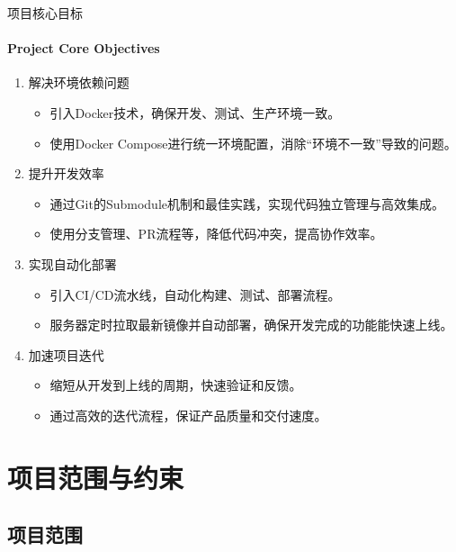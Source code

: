 \documentclass{beamer}
\begin{document}
\begin{frame}[fragile]{项目核心目标}
\framesubtitle{Project Core Objectives}
\begin{enumerate}
\item 解决环境依赖问题
\begin{itemize}
\item 引入Docker技术，确保开发、测试、生产环境一致。
\item 使用Docker Compose进行统一环境配置，消除“环境不一致”导致的问题。
\end{itemize}
\item 提升开发效率
\begin{itemize}
\item 通过Git的Submodule机制和最佳实践，实现代码独立管理与高效集成。
\item 使用分支管理、PR流程等，降低代码冲突，提高协作效率。
\end{itemize}
\item 实现自动化部署
\begin{itemize}
\item 引入CI/CD流水线，自动化构建、测试、部署流程。
\item 服务器定时拉取最新镜像并自动部署，确保开发完成的功能能快速上线。
\end{itemize}
\item 加速项目迭代
\begin{itemize}
\item 缩短从开发到上线的周期，快速验证和反馈。
\item 通过高效的迭代流程，保证产品质量和交付速度。
\end{itemize}
\end{enumerate}
\end{frame}


\section{项目范围与约束}


\subsection{项目范围}
\end{document}
